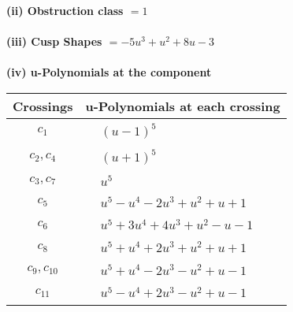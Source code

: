 \documentclass[1p]{elsarticle_modified}
\theoremstyle{definition}
\begin{document}
\flushleft \textbf{(ii) Obstruction class $= 1$}\\~\\
\flushleft \textbf{(iii) Cusp Shapes $= -5 u^3+u^2+8 u-3$}\\~\\
\newpage\renewcommand{\arraystretch}{1}
\flushleft \textbf{(iv) u-Polynomials at the component}\newline \\
\begin{tabular}{m{50pt}|m{274pt}}
Crossings & \hspace{64pt}u-Polynomials at each crossing \\
\hline $$\begin{aligned}c_{1}\end{aligned}$$&$\begin{aligned}
&(u-1)^5
\end{aligned}$\\
\hline $$\begin{aligned}c_{2},c_{4}\end{aligned}$$&$\begin{aligned}
&(u+1)^5
\end{aligned}$\\
\hline $$\begin{aligned}c_{3},c_{7}\end{aligned}$$&$\begin{aligned}
&u^5
\end{aligned}$\\
\hline $$\begin{aligned}c_{5}\end{aligned}$$&$\begin{aligned}
&u^5- u^4-2 u^3+u^2+u+1
\end{aligned}$\\
\hline $$\begin{aligned}c_{6}\end{aligned}$$&$\begin{aligned}
&u^5+3 u^4+4 u^3+u^2- u-1
\end{aligned}$\\
\hline $$\begin{aligned}c_{8}\end{aligned}$$&$\begin{aligned}
&u^5+u^4+2 u^3+u^2+u+1
\end{aligned}$\\
\hline $$\begin{aligned}c_{9},c_{10}\end{aligned}$$&$\begin{aligned}
&u^5+u^4-2 u^3- u^2+u-1
\end{aligned}$\\
\hline $$\begin{aligned}c_{11}\end{aligned}$$&$\begin{aligned}
&u^5- u^4+2 u^3- u^2+u-1
\end{aligned}$\\
\hline
\end{tabular}\\~\\
\end{document}
